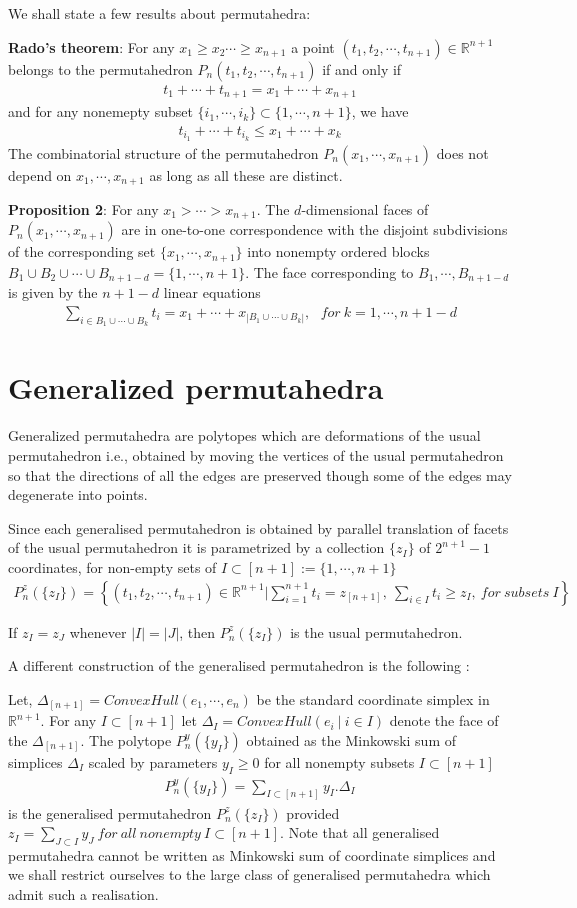 \documentclass[hidelinks,12pt]{article}
\newcommand{\bea}[1]{\begin{eqnarray}\label{#1} }
\newcommand{\eea}{\end{eqnarray}}
\def\bea{\begin{eqnarray}}
\def\eea{\end{eqnarray}}
\begin{document}
We shall state a few results about permutahedra:

{\bf Rado's theorem}: For any $x_1 \ge x_2  \cdots \ge x_{n+1}$ a point $(t_1,t_2, \cdots, t_{n+1}) \in \mathbb{R}^{n+1}$ belongs to the permutahedron $P_n(t_1,t_2, \cdots, t_{n+1})$ if and only if 
\bea
t_1+ \cdots +t_{n+1} = x_1 +\cdots+ x_{n+1} \nonumber
\eea
and for any nonemepty subset $\{i_1,\cdots,i_k \} \subset \{1,\cdots, n+1 \}$, we have 
\bea
t_{i_1}+ \cdots +t_{i_k} \leq x_1 +\cdots+ x_k \nonumber
\eea
The combinatorial structure of the permutahedron $P_n (x_1, \cdots, x_{n+1}) $ does not depend on $ x_1, \cdots, x_{n+1} $ as long as all these are distinct. 

{\bf Proposition 2}: For any  $x_1> \cdots > x_{n+1} $. The $d$-dimensional faces of $P_n ( x_1, \cdots, x_{n+1 })$ are in one-to-one correspondence with the disjoint subdivisions of the corresponding set $\{x_1,\cdots, x_{n+1 }\}$ into nonempty ordered blocks $B_1 \cup B_2 \cup \cdots \cup B_{n+1-d} =\{1,\cdots,n+1 \}$. The face corresponding to $B_1,\cdots, B_{n+1-d}$ is given by the $n+1-d$ linear equations 
\bea
\sum_{i \in B_1\cup \cdots \cup B_k} t_i = x_1 + \cdots +x_{| B_1 \cup \cdots \cup B_k |}, ~~~ for~ k=1,\cdots,n+1-d \nonumber
\eea 
\section*{Generalized permutahedra}
Generalized permutahedra are polytopes which are deformations of the usual permutahedron i.e., obtained by moving the vertices of the usual permutahedron so that the directions of all the edges are preserved though some of the edges may degenerate into points.

 Since each generalised permutahedron is obtained by parallel translation of facets of the usual permutahedron it is parametrized  by a collection $\{ z_I\}$ of $2^{n+1}-1$ coordinates, for non-empty sets of $I \subset [n+1] := \{1,\cdots,n+1 \}$
 \bea
 P_n^z(\{ z_I \}) = \left \{ (t_1, t_2, \cdots , t_{n+1}) \in \mathbb{R}^{n+1} | \sum_{i=1}^{n+1} t_i = z_{[n+1]},~ \sum_{i \in I} t_i \geq z_I, ~for ~subsets~ I  \right  \} \nonumber
 \eea
 
 If $z_I =z_J$ whenever $|I| =|J|$, then  $ P_n^z(\{ z_I \})$ is the usual permutahedron.
 
 
 A different construction of the generalised permutahedron is the following :
 
 Let, $\Delta_{[n+1]} = ConvexHull(e_1,\cdots,e_n)$ be the standard coordinate simplex in $\mathbb{R}^{n+1}$. For any $I \subset [n+1] $ let $\Delta_I =ConvexHull(e_i~|~i\in I)$ denote the face of the $\Delta_{[n+1]}$. The polytope $P_n^y(\{y_I \})$ obtained as the Minkowski sum of simplices $\Delta_I$ scaled by  parameters $y_I \geq 0$ for all nonempty subsets $I \subset [n+1]$
 \bea
 P_n^y(\{y_I \})= \sum_{I \subset[n+1]} y_I . \Delta_I  \nonumber
 \eea
is the generalised permutahedron $P_n^z(\{z_I \})$  provided $z_I = \sum_{J \subset I} y_J  ~ for ~all~nonempty ~I \subset [n+1]$.
Note that all generalised permutahedra cannot be written as Minkowski sum of coordinate simplices and we shall restrict ourselves to the large class of generalised permutahedra which admit such a realisation.
\end{document}
